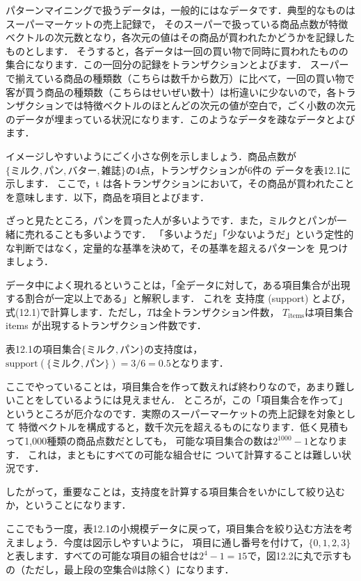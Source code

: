 パターンマイニングで扱うデータは，一般的にはなデータです．典型的なものはスーパーマーケットの売上記録で，
そのスーパーで扱っている商品点数が特徴ベクトルの次元数となり，各次元の値はその商品が買われたかどうかを記録したものとします．
そうすると，各データは一回の買い物で同時に買われたものの集合になります．この一回分の記録をトランザクションとよびます．
スーパーで揃えている商品の種類数（こちらは数千から数万）に比べて，一回の買い物で客が買う商品の種類数（こちらはせいぜい数十）は桁違いに少ないので，各トランザクションでは特徴ベクトルのほとんどの次元の値が空白で，ごく小数の次元のデータが埋まっている状況になります．このようなデータを疎なデータとよびます．

イメージしやすいようにごく小さな例を示しましょう．商品点数が$\{ミルク, パン, バター, 雑誌\}$の4点，トランザクションが6件の
データを表12.1に示します．
ここで，t は各トランザクションにおいて，その商品が買われたことを意味します．以下，商品を項目とよびます．


ざっと見たところ，パンを買った人が多いようです．また，ミルクとパンが一緒に売れることも多いようです．
「多いようだ」「少ないようだ」という定性的な判断ではなく，定量的な基準を決めて，その基準を超えるパターンを
見つけましょう．

データ中によく現れるということは，「全データに対して，ある項目集合が出現する割合が一定以上である」と解釈します．
これを
支持度 (support)
とよび，式(12.1)で計算します．ただし，$T$は全トランザクション件数，
$T_{\mbox{items}}$は項目集合 items が出現するトランザクション件数です．


表12.1の項目集合$\{ミルク, パン\}$の支持度は，$\mbox{support}(\{ミルク, パン\})= 3/6 =0.5$となります．


ここでやっていることは，項目集合を作って数えれば終わりなので，あまり難しいことをしているようには見えません．
ところが，この「項目集合を作って」というところが厄介なのです．実際のスーパーマーケットの売上記録を対象として
特徴ベクトルを構成すると，数千次元を超えるものになります．低く見積もって1,000種類の商品点数だとしても，
可能な項目集合の数は$2^{1000}-1$となります．
これは，まともにすべての可能な組合せに
ついて計算することは難しい状況です．

したがって，重要なことは，支持度を計算する項目集合をいかにして絞り込むか，ということになります．


ここでもう一度，表12.1の小規模データに戻って，項目集合を絞り込む方法を考えましょう．今度は図示しやすいように，
項目に通し番号を付けて，$\{0,1,2,3\}$と表します．すべての可能な項目の組合せは$2^4-1=15$で，図12.2に丸で示すもの（ただし，最上段の空集合$\emptyset$は除く）になります．


